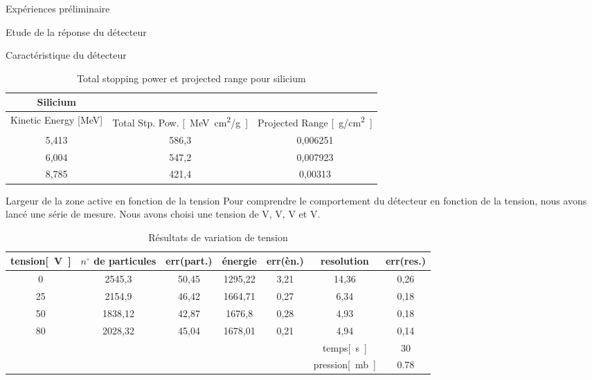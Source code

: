 \documentclass[a4paper,11pt]{scrartcl}
\begin{document}
  \begin{section}{Expériences préliminaire}
   \begin{subsection}{Etude de la réponse du détecteur}
    \begin{subsubsection}{Caractéristique du détecteur}
\begin{table}[htbp]
\begin{center}
\begin{tabular}{|c||c|c|}
\hline
Silicium& \multicolumn{ 2}{|c|}{} \\ \hline \hline
Kinetic Energy [MeV]	&	Total Stp. Pow. \unit[]{[MeV cm^2/g]}	&	Projected Range \unit[]{[g/cm^2]}	\\ \hline
5,413	&	586,3	&	0,006251	\\ \hline
6,004	&	547,2	&	0,007923	\\ \hline
8,785	&	421,4	&	0,00313	\\ \hline
\end{tabular}
\caption{Total stopping power et projected range pour silicium}
\end{center}
\end{table}
    \end{subsubsection}
    \begin{subsubsection}{Largeur de la zone active en fonction de la tension}
     Pour comprendre le comportement du détecteur en fonction de la tension, nous avons lancé une série de mesure. Nous avons choisi une tension de \unit[0]{V}, \unit[25]{V}, \unit[50]{V} et \unit[80]{V}.
\begin{table}[htbp]
\caption{Résultats de variation de tension}
\begin{center}
\begin{tabular}{|c||c|c|c|c|c|c|}
\hline
tension\unit{[V]} & $n^{\circ}$ de particules	& err(part.) & énergie	&	err(èn.)	& resolution & err(res.)	\\ \hline \hline
0	&	2545,3	&	50,45	&	1295,22	&	3,21	&	14,36	&	0,26		\\ \hline
25	&	2154,9	&	46,42	&	1664,71	&	0,27	&	6,34	&	0,18		\\ \hline
50	&	1838,12	&	42,87	&	1676,8	&	0,28	&	4,93	&	0,18		\\ \hline
80	&	2028,32	&	45,04	&	1678,01	&	0,21	&	4,94	&	0,14		\\ \hline\hline
\multicolumn{ 5}{|c|}{} & temps\unit{[s]} & 30 \\ \cline{ 6- 7}
\multicolumn{ 5}{|c|}{} & pression\unit{[mb]}& 0.78 \\ \hline
\end{tabular}
\end{center}
\end{table}


\end{subsubsection}
\end{subsection}
\end{section}
\end{document}
